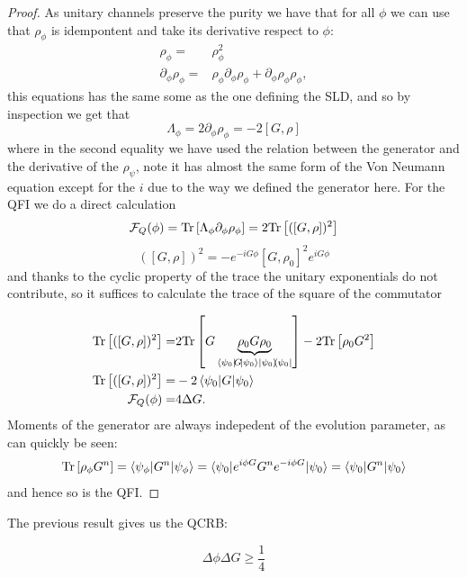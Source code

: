 \begin{proof}
  As unitary channels preserve the purity we have that for all $\phi$ we can use that $\rho_{\phi}$ is idempontent and take its derivative
  respect to $\phi$:
  \begin{align}
    \rho_{\phi} =& \rho_{\phi}^{2}\\
    \partial_{\phi}\rho_{\phi}  =& \rho_{\phi}\partial_{\phi}\rho_{\phi} +\partial_{\phi}\rho_{\phi} \rho_{\phi},
  \end{align}
  this equations has the same some as the one defining the SLD, and so by inspection we get that
  \begin{equation}
    \Lambda_{\phi} = 2\partial_{\phi}\rho_{\phi} = -2[ G, \rho ]
  \end{equation}
  where in the second equality we have used the relation between the generator and the derivative of the $\rho_{\psi}$, note it has almost
  the same form of the Von Neumann equation except for the $i$ due to the way we defined the generator here.
  For the QFI we do a direct calculation
  \begin{equation}
    \mathcal{F}_{Q}(\phi) = \mathrm{Tr}\left[\Lambda_{\phi}\partial_{\phi}\rho_{\phi}\right]= 2\mathrm{Tr}\left[([G, \rho ])^{2}\right]
  \end{equation}
\begin{equation}
     ([G, \rho ])^{2}= -e^{-iG\phi}[G, \rho_{0}]^{2}e^{iG\phi}
\end{equation}
and thanks to the cyclic property of the trace the unitary exponentials do not contribute, so it suffices to calculate the trace of the square
of the commutator

\begin{align}
\Tr{([G, \rho ])^{2}}=& 2\Tr{G\underbrace{\rho_{0}G\rho_{0}}_{\expectation{\psi_{0}}{G}\ketbra{\psi_{0}}}} - 2\Tr{\rho_{0}G^{2}}\\
  \Tr{([G, \rho ])^{2}}=&-2\expectation{\psi_{0}}{G}\\
  \mathcal{F}_{Q}(\phi) =&  4 \Delta G.
\end{align}
Moments of the generator are always indepedent of the evolution parameter, as can quickly be seen:
\begin{equation}
  \Tr{\rho_{\phi}G^{n}}= \expectation{\psi_{\phi}}{G^{n}}= \expectation{\psi_{0}}{e^{i\phi G}G^{n}e^{-i\phi G}} = \expectation{\psi_{0}}{ G^{n}}
\end{equation}
and hence so is the QFI.
\end{proof}
The previous result gives us the QCRB:

\begin{equation}\label{eq:unitary_QCRB}
  \Delta \phi \Delta G\geq \frac{1}{4}
\end{equation}

